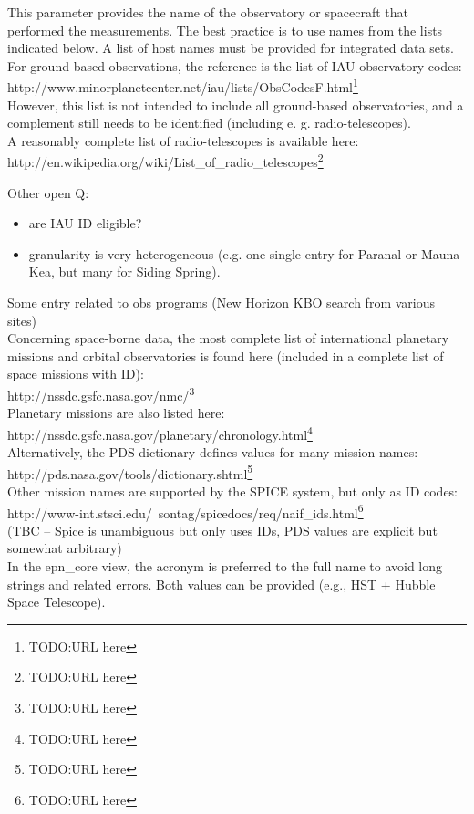 \documentclass[11pt,a4paper]{ivoa}
\begin{document}
This parameter provides the name of the observatory or spacecraft that performed the measurements. The best practice is to use names from the lists indicated below. A list of host names must be provided for integrated data sets. \\ For ground-based observations, the reference is the list of IAU observatory codes: http://www.minorplanetcenter.net/iau/lists/ObsCodesF.html\footnote{TODO:URL here}\\ However, this list is not intended to include all ground-based observatories, and a complement still needs to be identified (including e. g. radio-telescopes).\\ A reasonably complete list of radio-telescopes is available here: \\ http://en.wikipedia.org/wiki/List\_of\_radio\_telescopes\footnote{TODO:URL here}

Other open Q:

\begin{itemize}
\item are IAU ID eligible?
\item granularity is very heterogeneous (e.g. one single entry for Paranal or Mauna Kea, but many for Siding Spring).
\end{itemize}

Some entry related to obs programs (New Horizon KBO search from various sites) \\ Concerning space-borne data, the most complete list of international planetary missions and orbital observatories is found here (included in a complete list of space missions with ID):\\ http://nssdc.gsfc.nasa.gov/nmc/\footnote{TODO:URL here}\\ Planetary missions are also listed here:\\ http://nssdc.gsfc.nasa.gov/planetary/chronology.html\footnote{TODO:URL here} \\ Alternatively, the PDS dictionary defines values for many mission names:\\ http://pds.nasa.gov/tools/dictionary.shtml\footnote{TODO:URL here}\\ Other mission names are supported by the SPICE system, but only as ID codes:\\ http://www-int.stsci.edu/~sontag/spicedocs/req/naif\_ids.html\footnote{TODO:URL here}\\ (TBC – Spice is unambiguous but only uses IDs, PDS values are explicit but somewhat arbitrary)\\ In the epn\_core view, the acronym is preferred to the full name to avoid long strings and related errors. Both values can be provided (e.g., HST + Hubble Space Telescope).
\end{document}
